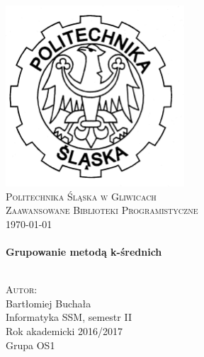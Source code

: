 \begin{titlepage}
	\begin{center}
		
		\includegraphics[width=0.5\textwidth]{logo.png}~\\[1cm]
		
		\textsc{\LARGE Politechnika Śląska w Gliwicach}\\[1.5cm]
		
		\textsc{\Large Zaawansowane Biblioteki Programistyczne}\\
		\textsc{\today}\\[0.5cm]
		
		\HRule \\[0.4cm]
		{ \huge \bfseries Grupowanie metodą k-średnich \\[0.4cm] }
		
		\HRule \\[1.5cm]
		
		\textsc{\Large Autor:} \\
		Bartłomiej Buchała \\
		[1.0cm]
		Informatyka SSM, semestr II \\
		Rok akademicki 2016/2017 \\
		Grupa OS1
		
		\vfill

	\vfill
\end{center}
\end{titlepage}